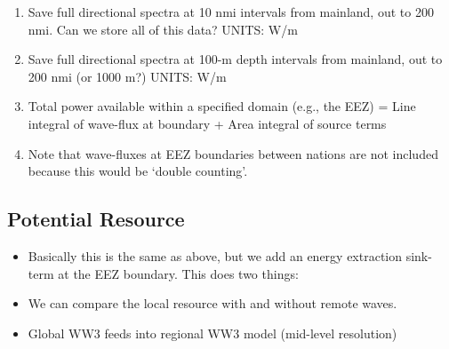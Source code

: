 \begin{enumerate}
\item Save full directional spectra at 10 nmi intervals from mainland, out to 200 nmi. Can we store all of this data? UNITS: W/m
\item Save full directional spectra at 100-m depth intervals from mainland, out to 200 nmi (or 1000 m?) UNITS: W/m
\item Total power available within a specified domain (e.g., the EEZ) = Line integral of wave-flux at boundary + Area integral of source terms
\item Note that wave-fluxes at EEZ boundaries between nations are not included because this would be ‘double counting’.
\end{enumerate}

\subsection{Potential Resource}

\begin{itemize}
\item Basically this is the same as above, but we add an energy extraction sink-term at the EEZ boundary. This does two things:
\item We can compare the local resource with and without remote waves.
\item Global WW3 feeds into regional WW3 model (mid-level resolution)
\end{itemize}

